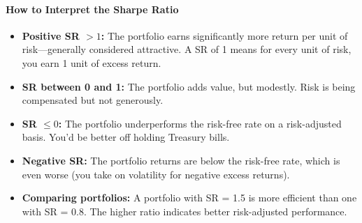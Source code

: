 \paragraph{How to Interpret the Sharpe Ratio}
\begin{itemize}
    \item \textbf{Positive SR $> 1$:} The portfolio earns significantly more return per unit of risk—generally considered attractive. A SR of 1 means for every unit of risk, you earn 1 unit of excess return.
    
    \item \textbf{SR between 0 and 1:} The portfolio adds value, but modestly. Risk is being compensated but not generously.
    
    \item \textbf{SR $\leq 0$:} The portfolio underperforms the risk-free rate on a risk-adjusted basis. You'd be better off holding Treasury bills.
    
    \item \textbf{Negative SR:} The portfolio returns are below the risk-free rate, which is even worse (you take on volatility for negative excess returns).
    
    \item \textbf{Comparing portfolios:} A portfolio with SR = 1.5 is more efficient than one with SR = 0.8. The higher ratio indicates better risk-adjusted performance.
\end{itemize}

